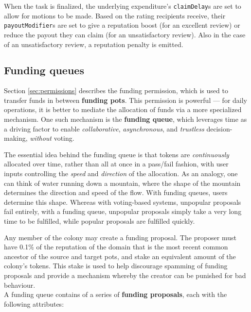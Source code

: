 When the task is finalized, the underlying expenditure's \texttt{claimDelay}s are set to allow for motions to be made. Based on the rating recipients receive, their \texttt{payoutModifier}s are set to give a reputation boost (for an excellent review) or reduce the payout they can claim (for an unsatisfactory review). Also in the case of an unsatisfactory review, a reputation penalty is emitted.

\subsection{Funding queues}\label{sec:funding-queues}

Section \ref{sec:permissions} describes the funding permission, which is used to transfer funds in between \textbf{funding pots}. This permission is powerful --- for daily operations, it is better to mediate the allocation of funds via a more specialized mechanism. One such mechanism is the \textbf{funding queue}, which leverages time as a driving factor to enable \textit{collaborative}, \textit{asynchronous}, and \textit{trustless} decision-making, \textit{without} voting.

The essential idea behind the funding queue is that tokens are \textit{continuously} allocated over time, rather than all at once in a pass/fail fashion, with user inputs controlling the \textit{speed} and \textit{direction} of the allocation. As an analogy, one can think of water running down a mountain, where the shape of the mountain determines the direction and speed of the flow. With funding queues, users determine this shape. Whereas with voting-based systems, unpopular proposals fail entirely, with a funding queue, unpopular proposals simply take a very long time to be fulfilled, while popular proposals are fulfilled quickly.

Any member of the colony may create a funding proposal. The proposer must have 0.1\% of the reputation of the domain that is the most recent common ancestor of the source and target pots, and stake an equivalent amount of the colony's tokens. This stake is used to help discourage spamming of funding proposals and provide a mechanism whereby the creator can be punished for bad behaviour. \\

A funding queue contains of a series of \textbf{funding proposals}, each with the following attributes:

